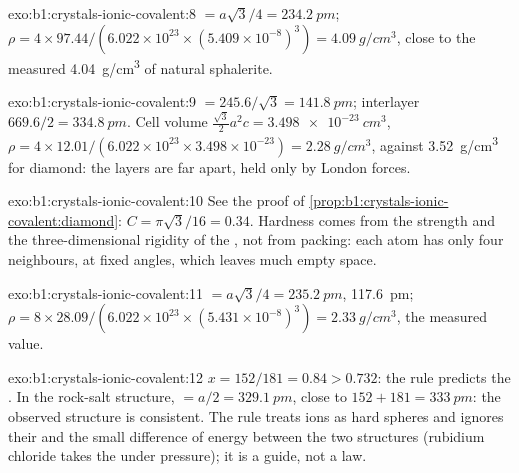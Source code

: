\begin{solution}{exo:b1:crystals-ionic-covalent:8}
 $= a\sqrt3/4 = \qty{234.2}{pm}$;
$\rho = 4 \times 97.44/(6.022 \times 10^{23} \times (5.409 \times
10^{-8})^3) = \qty{4.09}{g/cm^3}$, close to the measured
\qty{4.04}{g/cm^3} of natural sphalerite.
\end{solution}

\begin{solution}{exo:b1:crystals-ionic-covalent:9}
 $= 245.6/\sqrt3 = \qty{141.8}{pm}$; interlayer $669.6/2 =
\qty{334.8}{pm}$. Cell volume $\frac{\sqrt3}{2}a^2c = \qty{3.498e-23}{cm^3}$,
$\rho = 4 \times 12.01/(6.022 \times 10^{23} \times 3.498 \times 10^{-23})
= \qty{2.28}{g/cm^3}$, against \qty{3.52}{g/cm^3} for diamond: the layers
are far apart, held only by London forces.
\end{solution}

\begin{solution}{exo:b1:crystals-ionic-covalent:10}
See the proof of \cref{prop:b1:crystals-ionic-covalent:diamond}:
$C = \pi\sqrt3/16 = 0.34$. Hardness comes from the strength and the
three-dimensional rigidity of the , not from packing: each
atom has only four neighbours, at fixed angles, which leaves much empty
space.
\end{solution}

\begin{solution}{exo:b1:crystals-ionic-covalent:11}
 $= a\sqrt3/4 = \qty{235.2}{pm}$, 
\qty{117.6}{pm}; $\rho = 8 \times 28.09/(6.022 \times 10^{23} \times
(5.431 \times 10^{-8})^3) = \qty{2.33}{g/cm^3}$, the measured value.
\end{solution}

\begin{solution}{exo:b1:crystals-ionic-covalent:12}
$x = 152/181 = 0.84 > 0.732$: the rule predicts the .
In the rock-salt structure,  $= a/2 = \qty{329.1}{pm}$, close to
$152 + 181 = \qty{333}{pm}$: the observed structure is consistent. The
rule treats ions as hard spheres and ignores their  and
the small difference of energy between the two structures (rubidium
chloride takes the  under pressure); it is a guide,
not a law.
\end{solution}


